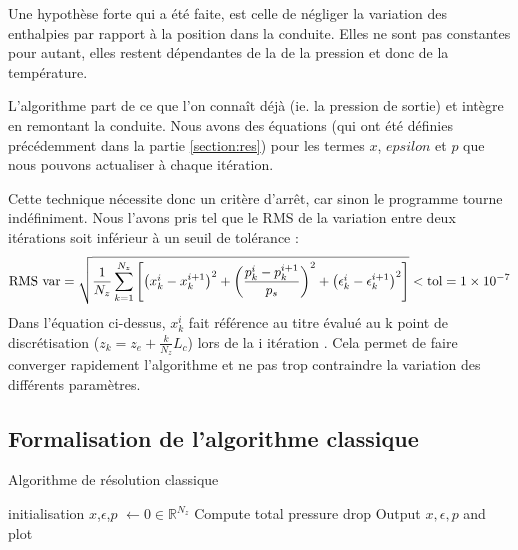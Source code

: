 Une hypothèse forte qui a été faite, est celle de négliger la variation des enthalpies par rapport à la position dans la conduite. Elles ne sont pas constantes pour autant, elles restent dépendantes de la de la pression et donc de la température.\\ \par
L'algorithme part de ce que l'on connaît déjà (ie. la pression de sortie) et intègre en \og remontant \fg{} la conduite. Nous avons des équations (qui ont été définies précédemment dans la partie \ref{section:res}) pour les termes $x$, $epsilon$ et $p$ que nous pouvons actualiser à chaque itération.\\ \par
Cette technique nécessite donc un critère d'arrêt, car sinon le programme tourne indéfiniment. Nous l'avons pris tel que le RMS de la variation entre deux itérations soit inférieur à un seuil de tolérance :
\begin{equation}
    \textnormal{RMS var} = \sqrt{\frac{1}{N_z}\sum_{k=1}^{N_z}\left[\left(x^{i}_k-x^{i+1}_k\right)^2 + \left(\frac{p^i_k- p^{i+1}_k}{p_s} \right)^2 + \left(\epsilon^i_k - \epsilon^{i+1}_k \right)^2\right]} <  \textnormal{tol} =\num{1e-7}
\end{equation}
Dans l'équation ci-dessus, $x^i_k$ fait référence au titre évalué au k point de discrétisation ($z_k = z_e + \frac{k}{N_z}L_c$) lors de la i itération . Cela permet de faire converger rapidement l'algorithme et ne pas trop contraindre la variation des différents paramètres.


\subsection{Formalisation de l'algorithme classique}
\begin{algorithm}
\caption{Algorithme de résolution classique}
\SetAlgoLined
{}
initialisation\;
$x$,$\epsilon$,$p$ $\leftarrow 0 \in \mathbb{R}^{N_z}$ \;
Compute total pressure drop\;
Output $x,\epsilon,p$ and plot\;
\end{algorithm}


